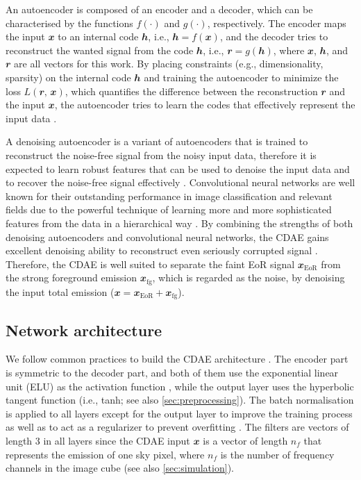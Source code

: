 \documentclass[letters,fleqn,usenatbib]{mnras}
\newcommand{\R}[1]{\mathrm{#1}}
\newcommand{\B}[1]{\mathbfit{#1}}
\begin{document}
An autoencoder is composed of an encoder and a decoder, which can be
characterised by the functions $f(\cdot)$ and $g(\cdot)$, respectively.
The encoder maps the input $\B{x}$ to an internal code $\B{h}$, i.e.,
$\B{h} = f(\B{x})$, and the decoder tries to reconstruct the wanted
signal from the code $\B{h}$, i.e., $\B{r} = g(\B{h})$, where $\B{x}$,
$\B{h}$, and $\B{r}$ are all vectors for this work.
By placing constraints (e.g., dimensionality, sparsity) on the
internal code $\B{h}$ and training the autoencoder to minimize the
loss $L(\B{r}, \, \B{x})$, which quantifies the difference between the
reconstruction $\B{r}$ and the input $\B{x}$, the autoencoder tries to
learn the codes that effectively represent the input data
\citep[e.g.,][chapter 14]{goodfellow2016}.

A denoising autoencoder is a variant of autoencoders that is trained
to reconstruct the noise-free signal from the noisy input data,
therefore it is expected to learn robust features that can be used to
denoise the input data and to recover the noise-free signal effectively
\citep[e.g.,][]{vincent2008,xie2012}.
Convolutional neural networks are well known for their outstanding
performance in image classification and relevant fields due to the
powerful technique of learning more and more sophisticated features
from the data in a hierarchical way \citep{lecun2015}.
By combining the strengths of both denoising autoencoders and
convolutional neural networks, the CDAE gains excellent denoising
ability to reconstruct even seriously corrupted signal \citep{du2017}.
Therefore, the CDAE is well suited to separate the faint EoR signal
$\B{x}_{\R{EoR}}$ from the strong foreground emission $\B{x}_{\R{fg}}$,
which is regarded as the noise, by denoising the input total emission
($\B{x} = \B{x}_{\R{EoR}} + \B{x}_{\R{fg}}$).


\subsection{Network architecture}
\label{sec:architecture}

We follow common practices to build the CDAE architecture
\citep[e.g.,][]{suganuma2018,geron2017}.
The encoder part is symmetric to the decoder part, and both of them
use the exponential linear unit (ELU) as the activation function
\citep{clevert2016},
while the output layer uses the hyperbolic tangent function
(i.e., tanh; see also \autoref{sec:preprocessing}).
The batch normalisation is applied to all layers except for the output
layer to improve the training process as well as to act as a regularizer
to prevent overfitting \citep{ioffe2015}.
The filters are vectors of length 3 in all layers
since the CDAE input $\B{x}$ is a vector of length $n_f$ that represents
the emission of one sky pixel, where $n_f$ is the number of frequency
channels in the image cube (see also \autoref{sec:simulation}).
\end{document}
